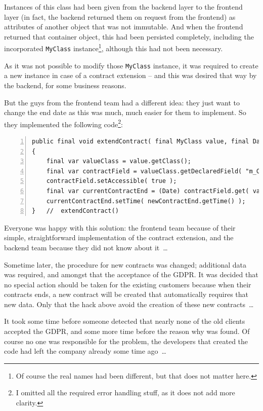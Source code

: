 \documentclass[11pt,a4paper, titlepage, parskip=half, headsepline, footsepline, cleardoublepage=current, headheight=1cm]{scrbook}
\begin{document}
Instances of this class had been given from the backend layer to the frontend layer (in fact,  the backend returned them on request from the frontend) as attributes of another object that was not immutable. And when the frontend returned that container object, this had been persisted completely, including the incorporated \lstinline|MyClass| instance\footnote{Of course the real names had been different, but that does not matter here.}, although this had not been necessary.

As it was not possible to modify those \lstinline|MyClass| instance, it was required to create a new instance in case of a contract extension – and this was desired that way by the backend, for some business reasons.

But the guys from the frontend team had a different idea: they just want to change the end date as this was much, much easier for them to implement. So they implemented the following code\footnote{I omitted all the required error handling stuff, as it does not add more clarity.}:
\begin{lstlisting}[numbers=left]
public final void extendContract( final MyClass value, final Date newContractEnd )
{
	final var valueClass = value.getClass();
	final var contractField = valueClass.getDeclaredField( "m_ContractEnd" );
	contractField.setAccessible( true );
	final var currentContractEnd = (Date) contractField.get( value );
	currentContractEnd.setTime( newContractEnd.getTime() );
}   //  extendContract()
\end{lstlisting}

Everyone was happy with this solution: the frontend team because of their simple, straightforward implementation of the contract extension, and the backend team because they did not know about it~…

Sometime later, the procedure for new contracts was changed; additional data was required, and amongst that the acceptance of the GDPR. It was decided that no special action should be taken for the existing customers because when their contracts ends, a new contract will be created that automatically requires that new data. Only that the hack above avoid the creation of these new contracts~…

It took some time before someone detected that nearly none of the old clients accepted the GDPR, and some more time before the reason why was found. Of course no one was responsible for the problem, the developers that created the code had left the company already some time ago~…
\end{document}
